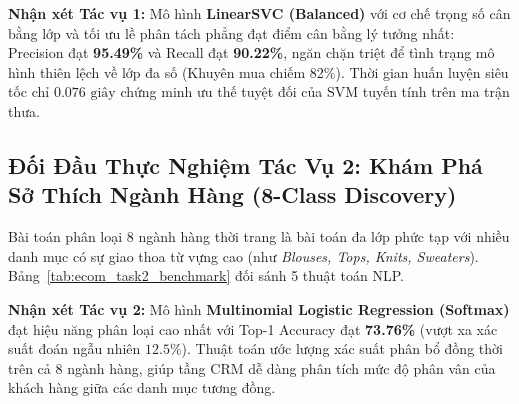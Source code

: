 \documentclass[12pt,a4paper]{report}
\begin{document}
\textbf{Nhận xét Tác vụ 1:} 
Mô hình \textbf{LinearSVC (Balanced)} với cơ chế trọng số cân bằng lớp và tối ưu lề phân tách phẳng đạt điểm cân bằng lý tưởng nhất: Precision đạt \textbf{95.49\%} và Recall đạt \textbf{90.22\%}, ngăn chặn triệt để tình trạng mô hình thiên lệch về lớp đa số (Khuyên mua chiếm 82\%). Thời gian huấn luyện siêu tốc chỉ $0.076\text{ giây}$ chứng minh ưu thế tuyệt đối của SVM tuyến tính trên ma trận thưa.

\subsection{Đối Đầu Thực Nghiệm Tác Vụ 2: Khám Phá Sở Thích Ngành Hàng (8-Class Discovery)}
Bài toán phân loại 8 ngành hàng thời trang là bài toán đa lớp phức tạp với nhiều danh mục có sự giao thoa từ vựng cao (như \textit{Blouses, Tops, Knits, Sweaters}). Bảng~\ref{tab:ecom_task2_benchmark} đối sánh 5 thuật toán NLP.

\begin{table}[H]
\centering
\caption{Bảng so sánh hiệu năng 5 mô hình NLP cho Tác vụ 2 (Khám phá Ngành hàng 8 lớp)}
\label{tab:ecom_task2_benchmark}
\end{table}

\textbf{Nhận xét Tác vụ 2:}
Mô hình \textbf{Multinomial Logistic Regression (Softmax)} đạt hiệu năng phân loại cao nhất với Top-1 Accuracy đạt \textbf{73.76\%} (vượt xa xác suất đoán ngẫu nhiên $12.5\%$). Thuật toán ước lượng xác suất phân bổ đồng thời trên cả 8 ngành hàng, giúp tầng CRM dễ dàng phân tích mức độ phân vân của khách hàng giữa các danh mục tương đồng.
\end{document}
